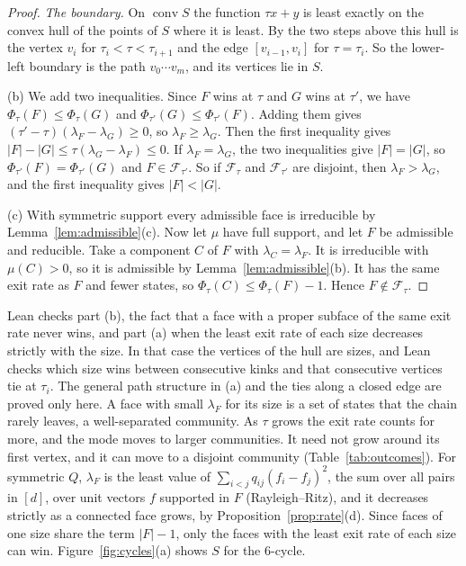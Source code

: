 \begin{proof}
\emph{The boundary.} On $\operatorname{conv}S$ the function $\tau x+y$ is least exactly on the
convex hull of the points of $S$ where it is least. By the two steps above this hull is the
vertex $v_i$ for $\tau_i<\tau<\tau_{i+1}$ and the edge $[v_{i-1},v_i]$ for $\tau=\tau_i$. So the
lower-left boundary is the path $v_0\cdots v_m$, and its vertices lie in $S$.

(b) We add two inequalities. Since $F$ wins at $\tau$ and $G$ wins at $\tau'$, we have
$\Phi_\tau(F)\le\Phi_\tau(G)$ and $\Phi_{\tau'}(G)\le\Phi_{\tau'}(F)$. Adding them gives
$(\tau'-\tau)(\lambda_F-\lambda_G)\ge0$, so $\lambda_F\ge\lambda_G$. Then the first inequality
gives $\lvert F\rvert-\lvert G\rvert\le\tau(\lambda_G-\lambda_F)\le0$. If
$\lambda_F=\lambda_G$, the two inequalities give $\lvert F\rvert=\lvert G\rvert$, so
$\Phi_{\tau'}(F)=\Phi_{\tau'}(G)$ and $F\in\mathcal F_{\tau'}$. So if $\mathcal F_\tau$ and
$\mathcal F_{\tau'}$ are disjoint, then $\lambda_F>\lambda_G$, and the first inequality gives
$\lvert F\rvert<\lvert G\rvert$.

(c) With symmetric support every admissible face is irreducible by
Lemma~\ref{lem:admissible}(c). Now let $\mu$ have full support, and let $F$ be admissible and
reducible. Take a component $C$ of $F$ with $\lambda_C=\lambda_F$. It is irreducible with
$\mu(C)>0$, so it is admissible by Lemma~\ref{lem:admissible}(b). It has the same exit rate as
$F$ and fewer states, so $\Phi_\tau(C)\le\Phi_\tau(F)-1$. Hence $F\notin\mathcal F_\tau$.
\end{proof}

Lean checks part (b), the fact that a face with a proper subface of the same exit
rate never wins, and part (a) when the least exit rate of each size decreases
strictly with the size. In that case the vertices of the hull are sizes, and
Lean checks which size wins between consecutive kinks and that consecutive
vertices tie at $\tau_i$. The general path structure in (a) and the ties along
a closed edge are proved only here. A face with small $\lambda_F$ for
its size is a set of states that the chain rarely leaves, a well-separated community. As $\tau$
grows the exit rate counts for more, and the mode moves to larger communities. It need not
grow around its first vertex, and it can move to a disjoint community (Table~\ref{tab:outcomes}).
For symmetric $Q$, $\lambda_F$ is the least value of
$\sum_{i<j}q_{ij}(f_i-f_j)^2$, the sum over all pairs in $[d]$, over unit
vectors $f$ supported in $F$ (Rayleigh--Ritz), and it
decreases strictly as a connected face grows, by Proposition~\ref{prop:rate}(d). Since faces of one size share the term
$\lvert F\rvert-1$, only the faces with the least exit rate of each size can win. Figure~\ref{fig:cycles}(a) shows $S$ for the 6-cycle.

